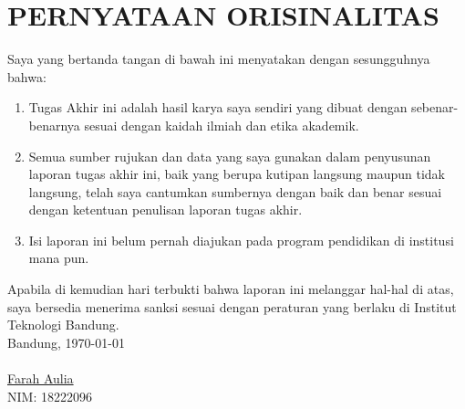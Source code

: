 \chapter*{PERNYATAAN ORISINALITAS}
\vspace{2cm}
Saya yang bertanda tangan di bawah ini menyatakan dengan sesungguhnya bahwa:
\begin{enumerate}
    \item Tugas Akhir ini adalah hasil karya saya sendiri yang dibuat dengan sebenar-benarnya sesuai dengan kaidah ilmiah dan etika akademik.
    \item Semua sumber rujukan dan data yang saya gunakan dalam penyusunan laporan tugas akhir ini, baik yang berupa kutipan langsung maupun tidak langsung, telah saya cantumkan sumbernya dengan baik dan benar sesuai dengan ketentuan penulisan laporan tugas akhir.
    \item Isi laporan ini belum pernah diajukan pada program pendidikan di institusi mana pun.
\end{enumerate}
Apabila di kemudian hari terbukti bahwa laporan ini melanggar hal-hal di atas, saya bersedia menerima sanksi sesuai dengan peraturan yang berlaku di Institut Teknologi Bandung.
\\[2cm]
Bandung, \today\\
\\[2cm]

\underline{Farah Aulia} \\
NIM: 18222096
  
